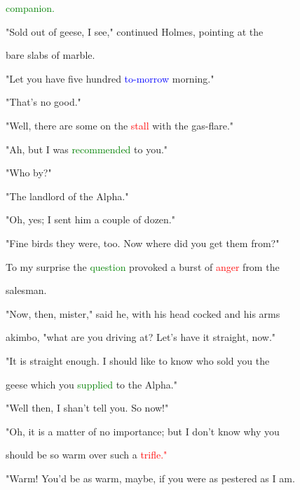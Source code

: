  \textcolor{green}{companion.}



 "Sold out of geese, I see," continued Holmes, pointing at the

 bare slabs of marble.



 "Let you have five hundred \textcolor{blue}{to-morrow} morning."



 "That's no \textcolor{BurntOrange}{good."}



 "Well, there are some on the \textcolor{red}{stall} with the gas-flare."



 "Ah, but I was \textcolor{green}{recommended} to you."



 "Who by?"



 "The landlord of the Alpha."



 "Oh, yes; I sent him a couple of dozen."



 "Fine birds they were, too. Now where did you get them from?"



 To my \textcolor{BurntOrange}{surprise} the \textcolor{green}{question} provoked a burst of \textcolor{red}{anger} from the

 salesman.



 "Now, then, mister," said he, with his head cocked and his arms

 akimbo, "what are you driving at? Let's have it straight, now."



 "It is straight enough. I should like to know who sold you the

 geese which you \textcolor{green}{supplied} to the Alpha."



 "Well then, I shan't tell you. So now!"



 "Oh, it is a matter of no \textcolor{BurntOrange}{importance;} but I don't know why you

 should be so warm over such a \textcolor{red}{trifle."}



 "Warm! You'd be as warm, maybe, if you were as pestered as I am.

